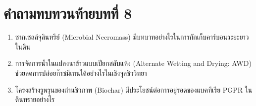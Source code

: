 \section*{คำถามทบทวนท้ายบทที่ 8}
\begin{enumerate}
    \item ซากเซลล์จุลินทรีย์ (Microbial Necromass) มีบทบาทอย่างไรในการกักเก็บคาร์บอนระยะยาวในดิน
    \item การจัดการน้ำในแปลงนาข้าวแบบเปียกสลับแห้ง (Alternate Wetting and Drying: AWD) ช่วยลดการปล่อยก๊าซมีเทนได้อย่างไรในเชิงจุลชีววิทยา
    \item โครงสร้างรูพรุนของถ่านชีวภาพ (Biochar) มีประโยชน์ต่อการอยู่รอดของแบคทีเรีย PGPR ในดินทรายอย่างไร
\end{enumerate}

\clearpage